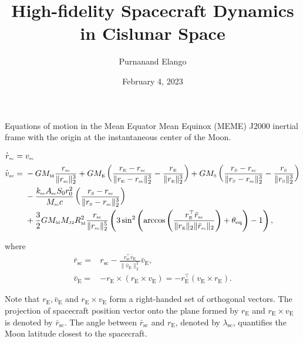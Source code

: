 \documentclass[12pt,letterpaper]{article}
\title{High-fidelity Spacecraft Dynamics in Cislunar Space}
\author{Purnanand Elango}
\date{February 4, 2023}
\renewcommand{\dot}[1]{\overset{\text{{\large .}}}{#1}}
\newcommand{\rsc}{r_{\scriptscriptstyle\text{sc}}}
\newcommand{\lamsc}{\lambda_{\scriptscriptstyle\text{sc}}}
\newcommand{\vsc}{v_{\scriptscriptstyle\text{sc}}}
\newcommand{\brsc}{\bar{r}_{\scriptscriptstyle\text{sc}}}
\newcommand{\drsc}{\dot{r}_{\scriptscriptstyle\text{sc}}}
\newcommand{\dvsc}{\dot{v}_{\scriptscriptstyle\text{sc}}}
\newcommand{\rE}{r_{\scriptscriptstyle\text{E}}}
\newcommand{\rS}{r_{\scriptscriptstyle \text{S}}}
\newcommand{\vE}{v_{\scriptscriptstyle \text{E}}}
\newcommand{\bvE}{\bar{v}_{\scriptscriptstyle \text{E}}}
\newcommand{\ME}{M_{\scriptscriptstyle \text{E}}}
\newcommand{\MM}{M_{\scriptscriptstyle \text{M}}}
\newcommand{\MS}{M_{\scriptscriptstyle \text{S}}}
\newcommand{\RM}{R_{\scriptscriptstyle \text{M}}}
\newcommand{\MJtwo}{M_{\scriptscriptstyle \text{J2}}}
\newcommand{\thteq}{\theta_{\text{eq}}}
\newcommand{\ksc}{k_{\scriptscriptstyle\text{sc}}}
\newcommand{\Msc}{M_{\scriptscriptstyle\text{sc}}}
\newcommand{\Asc}{A_{\scriptscriptstyle\text{sc}}}
\begin{document}
\maketitle

Equations of motion in the Mean Equator Mean Equinox (MEME) J2000 inertial frame with the origin at the instantaneous center of the Moon.  

\begin{subequations}
\begin{align}
    \drsc ={} &\vsc\\
    \dvsc ={} & \displaystyle-G\MM \frac{\rsc}{\|\rsc\|_2^3} + G\ME\left( \frac{\rE - \rsc}{\| \rE - \rsc \|_2^3} - \frac{\rE}{\|\rE\|_2^3}\right) + G\MS\left( \frac{\rS - \rsc}{\| \rS - \rsc \|_2^3} - \frac{\rS}{\|\rS\|_2^3}\right) \nonumber \\
     & - \frac{\ksc\Asc S_0r_0^2}{\Msc c} \left( \frac{\rS - \rsc}{\| \rS - \rsc \|_2^3} \right)\\
     & + \frac{3}{2}G\MM\MJtwo\RM^2\frac{\rsc}{\|\rsc\|_2^5}\left( 3\sin^2 \left( \arccos\left(\frac{\rE^\top \brsc}{\|\rE\|_2\|\brsc\|_2}\right)+\thteq\right) - 1 \right),\nonumber
\end{align}    
\end{subequations}

where 
\begin{align}
    \brsc ={} & \rsc - \displaystyle \frac{\rsc^\top\bvE}{\|\bvE\|^2_2}\bvE,\\
    \bvE ={} & - \rE \times (\rE\times\vE)  = -\rE^\top(\vE\times\rE).  
\end{align}

Note that $\rE,\bvE$ and $\rE\times\vE$ form a right-handed set of orthogonal vectors. The projection of spacecraft position vector onto the plane formed by $\rE$ and $\rE\times\vE$ is denoted by $\brsc$. The angle between $\brsc$ and $\rE$, denoted by $\lamsc$, quantifies the Moon latitude closest to the spacecraft. 


\end{document}
